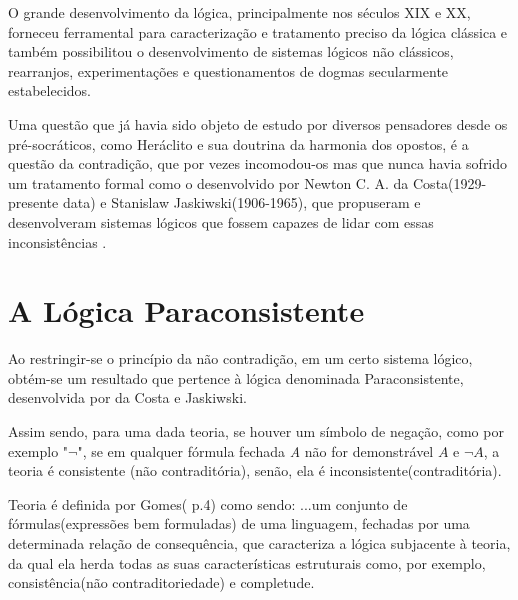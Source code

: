 O grande desenvolvimento da lógica, 
principalmente nos séculos XIX e XX, 
forneceu ferramental para caracterização e 
tratamento preciso da lógica clássica 
e também possibilitou o desenvolvimento de sistemas lógicos não clássicos, 
rearranjos, experimentações e 
questionamentos de dogmas secularmente estabelecidos.

Uma questão que já havia sido objeto de estudo por diversos pensadores desde os pré-socráticos, 
como Heráclito e sua doutrina da harmonia dos opostos, 
é a questão da contradição, 
que por vezes incomodou-os 
mas que nunca havia sofrido um tratamento formal 
como o desenvolvido por 
Newton C. A. da Costa(1929-presente data) e 
Stanislaw Jaskiwski(1906-1965), 
que propuseram e desenvolveram sistemas lógicos que fossem capazes de lidar com essas inconsistências \cite{DecioKrause}. 





\section{A Lógica Paraconsistente}





Ao restringir-se o princípio da não contradição, 
em um certo sistema lógico, 
obtém-se um resultado que pertence à lógica denominada Paraconsistente, 
desenvolvida por da Costa e Jaskiwski. 



Assim sendo, para uma dada teoria, 
se houver um símbolo de negação, 
como por exemplo "\emph{$\neg $}", 
se em qualquer fórmula fechada \emph{A} não for demonstrável \emph{$A$} e \emph{$\neg A $}, 
a teoria é consistente (não contraditória), 
senão, ela é inconsistente(contraditória).


Teoria é definida por Gomes(\citeyear{Gomes2013} p.4) como sendo:
\citacao
{
...um conjunto de fórmulas(expressões bem formuladas) de uma linguagem, 
fechadas por uma determinada relação de consequência, 
que caracteriza a lógica subjacente à teoria, 
da qual ela herda todas as suas características estruturais como, 
por exemplo, consistência(não contraditoriedade) e completude.
}

